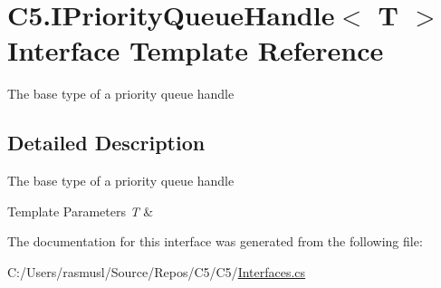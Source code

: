 \hypertarget{interface_c5_1_1_i_priority_queue_handle}{}\section{C5.\+I\+Priority\+Queue\+Handle$<$ T $>$ Interface Template Reference}
\label{interface_c5_1_1_i_priority_queue_handle}


The base type of a priority queue handle  




\subsection{Detailed Description}
The base type of a priority queue handle 


\begin{DoxyTemplParams}{Template Parameters}
{\em T} & \\
\hline
\end{DoxyTemplParams}


The documentation for this interface was generated from the following file\+:\begin{DoxyCompactItemize}
\item 
C\+:/\+Users/rasmusl/\+Source/\+Repos/\+C5/\+C5/\hyperlink{_interfaces_8cs}{Interfaces.\+cs}\end{DoxyCompactItemize}
